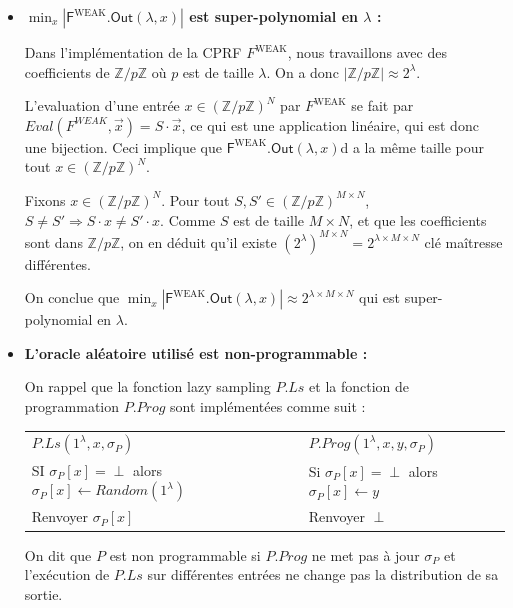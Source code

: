\documentclass[9pt]{extarticle}
\begin{document}
\begin{itemize}
\item \textbf{$\min_x |\textsf{F}^{\text{WEAK}}\textsf{.Out}(\lambda, x)|$ est super-polynomial en $\lambda$ :}

Dans l'implémentation de la CPRF $F^{\text{WEAK}}$, nous travaillons avec des coefficients de $\mathbb{Z}/p\mathbb{Z}$ où $p$ est de taille $\lambda$. On a donc $|\mathbb{Z}/p\mathbb{Z}| \approx 2^{\lambda}$.

L'evaluation d'une entrée $x \in (\mathbb{Z}/p\mathbb{Z})^N$ par $F^{\text{WEAK}}$ se fait par $Eval(F^{WEAK},\vec{x}) = S \cdot \vec{x}$, ce qui est une application linéaire, qui est donc une bijection. Ceci implique que $\textsf{F}^{\text{WEAK}}\textsf{.Out}(\lambda, x)$d a la même taille pour tout $x \in (\mathbb{Z}/p\mathbb{Z})^N$.

Fixons $x \in (\mathbb{Z}/p\mathbb{Z})^N$. Pour tout $S,S' \in (\mathbb{Z}/p\mathbb{Z})^{M \times N}$, $S \neq S' \Rightarrow S \cdot x \neq S' \cdot x$. Comme $S$ est de taille $M \times N$, et que les coefficients sont dans $\mathbb{Z}/p\mathbb{Z}$, on en déduit qu'il existe  $(2^{\lambda})^{M \times N} = 2^{\lambda \times M \times N}$ clé maîtresse différentes.

On conclue que $\min_x |\textsf{F}^{\text{WEAK}}\textsf{.Out}(\lambda, x)| \approx 2^{\lambda \times M \times N}$ qui est super-polynomial en $\lambda$.

\item \textbf{L'oracle aléatoire utilisé est non-programmable :}

On rappel que la fonction lazy sampling $P.Ls$ et la fonction de programmation $P.Prog$ sont implémentées comme suit :



\begin{center}
  \begin{tabular}{l|l}
    \textbf{\underline{$P.Ls(1^{\lambda}, x, \sigma_P)$}} & \textbf{\underline{$P.Prog(1^{\lambda}, x, y, \sigma_P)$}} \\
    SI $\sigma_P[x] = \perp$ alors $\sigma_P[x] \leftarrow Random(1^{\lambda})$ & Si $\sigma_P[x] = \perp$ alors $\sigma_P[x] \leftarrow y$ \\
    Renvoyer $\sigma_P[x]$ & Renvoyer $\perp$
  \end{tabular}
\end{center}

On dit que $P$ est non programmable si $P.Prog$ ne met pas à jour $\sigma_P$ et l'exécution de $P.Ls$ sur différentes entrées ne change pas la distribution de sa sortie.


\end{itemize}
\end{document}
